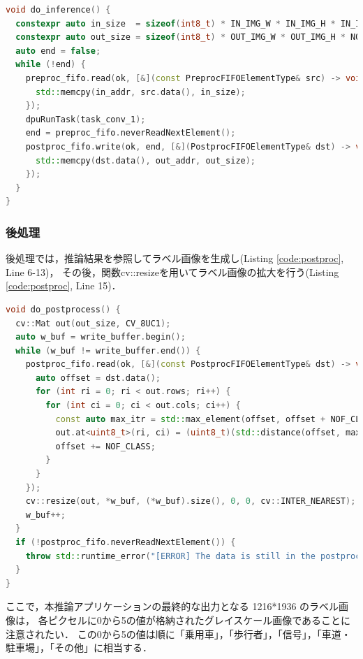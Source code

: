 \setcounter{lstnumber}{1}
\begin{lstlisting}[language=c++,firstnumber=last,caption=do\_inference(),label=code:inference]
void do_inference() {
  constexpr auto in_size  = sizeof(int8_t) * IN_IMG_W * IN_IMG_H * IN_IMG_C;
  constexpr auto out_size = sizeof(int8_t) * OUT_IMG_W * OUT_IMG_H * NOF_CLASS;
  auto end = false;
  while (!end) {
    preproc_fifo.read(ok, [&](const PreprocFIFOElementType& src) -> void {
      std::memcpy(in_addr, src.data(), in_size);
    });
    dpuRunTask(task_conv_1);
    end = preproc_fifo.neverReadNextElement();
    postproc_fifo.write(ok, end, [&](PostprocFIFOElementType& dst) -> void {
      std::memcpy(dst.data(), out_addr, out_size);
    });
  }
}
\end{lstlisting}

\subsubsection{後処理}
後処理では，推論結果を参照してラベル画像を生成し(Listing \ref{code:postproc}, Line 6-13)，
その後，関数cv::resizeを用いてラベル画像の拡大を行う(Listing \ref{code:postproc}, Line 15)．

\setcounter{lstnumber}{1}
\begin{lstlisting}[language=c++,firstnumber=last,caption=do\_postprocess(),label=code:postproc]
void do_postprocess() {
  cv::Mat out(out_size, CV_8UC1);
  auto w_buf = write_buffer.begin();
  while (w_buf != write_buffer.end()) {
    postproc_fifo.read(ok, [&](const PostprocFIFOElementType& dst) -> void {
      auto offset = dst.data();
      for (int ri = 0; ri < out.rows; ri++) {
        for (int ci = 0; ci < out.cols; ci++) {
          const auto max_itr = std::max_element(offset, offset + NOF_CLASS);
          out.at<uint8_t>(ri, ci) = (uint8_t)(std::distance(offset, max_itr));
          offset += NOF_CLASS;
        }
      }
    });
    cv::resize(out, *w_buf, (*w_buf).size(), 0, 0, cv::INTER_NEAREST);
    w_buf++;
  }
  if (!postproc_fifo.neverReadNextElement()) {
    throw std::runtime_error("[ERROR] The data is still in the postproc FIFO.");
  }
}
\end{lstlisting}

ここで，本推論アプリケーションの最終的な出力となる 1216*1936 のラベル画像は，
各ピクセルに0から5の値が格納されたグレイスケール画像であることに注意されたい．
この0から5の値は順に「乗用車」，「歩行者」，「信号」，「車道・駐車場」，「その他」に相当する．
